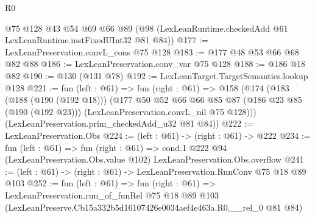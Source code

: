 \begin{lexlean}{R0}
\begin{coremodule}
    @75
    @128
    @43
    @54
    @69
    @66
    @89
    (@98 (LexLeanRuntime.checkedAdd @61 LexLeanRuntime.instFixedUInt32 @81 @84))
@177 := LexLeanPreservation.convL_cons @75 @128
@183 := @177 @48 @53 @66 @68 @82 @88
@186 := LexLeanPreservation.conv_var @75 @128
@188 := @186 @18 @82
@190 := @130 (@131 @78)
@192 := LexLeanTarget.TargetSemantics.lookup @128
@221 := fun (left : @61) =>
  fun (right : @61) =>
  @158
    (@174
      (@183
        (@188 (@190 (@192 @18)))
        (@177
          @50
          @52
          @66
          @66
          @85
          @87
          (@186 @23 @85 (@190 (@192 @23)))
          (LexLeanPreservation.convL_nil @75 @128)))
      (LexLeanPreservation.prim_checkedAdd_u32 @81 @84))
@222 := LexLeanPreservation.Obs
@224 := (left : @61) -> (right : @61) -> @222
@234 := fun (left : @61) =>
  fun (right : @61) =>
  cond.{1} @222 @94 (LexLeanPreservation.Obs.value @102) LexLeanPreservation.Obs.overflow
@241 := (left : @61) -> (right : @61) -> LexLeanPreservation.RunConv @75 @18 @89 @103
@252 := fun (left : @61) =>
  fun (right : @61) =>
  LexLeanPreservation.run_of_funRel
    @75
    @18
    @89
    @103
    (LexLeanPreserve.Cb15a332b5d16107426e0034aef4e463a.R0.__rel_0 @81 @84)
\end{coremodule}
\end{lexlean}
